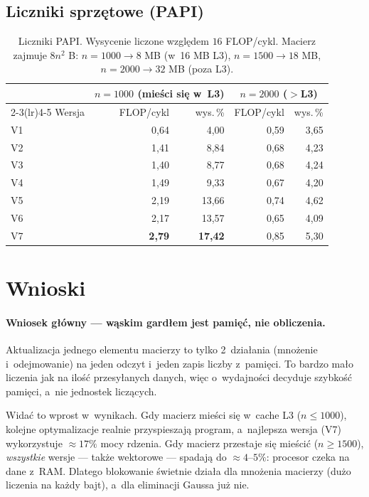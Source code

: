 \documentclass[11pt,a4paper]{article}
\begin{document}
\subsection{Liczniki sprzętowe (PAPI)}

\begin{table}[H]\centering
\begin{tabular}{lrrrr}
\toprule
 & \multicolumn{2}{c}{$n=1000$ (mieści się w~L3)} & \multicolumn{2}{c}{$n=2000$ ($>$L3)} \\
\cmidrule(lr){2-3}\cmidrule(lr){4-5}
Wersja & FLOP/cykl & wys.\,\% & FLOP/cykl & wys.\,\% \\
\midrule
V1 & 0{,}64 & 4{,}00 & 0{,}59 & 3{,}65 \\
V2 & 1{,}41 & 8{,}84 & 0{,}68 & 4{,}23 \\
V3 & 1{,}40 & 8{,}77 & 0{,}68 & 4{,}24 \\
V4 & 1{,}49 & 9{,}33 & 0{,}67 & 4{,}20 \\
V5 & 2{,}19 & 13{,}66 & 0{,}74 & 4{,}62 \\
V6 & 2{,}17 & 13{,}57 & 0{,}65 & 4{,}09 \\
V7 & \textbf{2{,}79} & \textbf{17{,}42} & 0{,}85 & 5{,}30 \\
\bottomrule
\end{tabular}
\caption{Liczniki PAPI. Wysycenie liczone względem $16$ FLOP/cykl. Macierz zajmuje $8n^2$ B:
$n=1000\to8$ MB (w~16 MB L3), $n=1500\to18$ MB, $n=2000\to32$ MB (poza L3).}
\label{tab:papi}
\end{table}

\section{Wnioski}

\paragraph{Wniosek główny --- wąskim gardłem jest pamięć, nie obliczenia.}
Aktualizacja jednego elementu macierzy to tylko 2~działania (mnożenie i~odejmowanie) na jeden
odczyt i~jeden zapis liczby z~pamięci. To bardzo mało liczenia jak na ilość przesyłanych danych,
więc o~wydajności decyduje szybkość pamięci, a~nie jednostek liczących.

Widać to wprost w~wynikach. Gdy macierz mieści się w~cache L3 ($n\le1000$), kolejne optymalizacje
realnie przyspieszają program, a~najlepsza wersja (V7) wykorzystuje $\approx17\%$ mocy rdzenia.
Gdy macierz przestaje się mieścić ($n\ge1500$), \emph{wszystkie} wersje --- także wektorowe ---
spadają do $\approx4$--$5\%$: procesor czeka na dane z~RAM. Dlatego blokowanie świetnie działa
dla mnożenia macierzy (dużo liczenia na każdy bajt), a~dla eliminacji Gaussa już nie.
\end{document}
